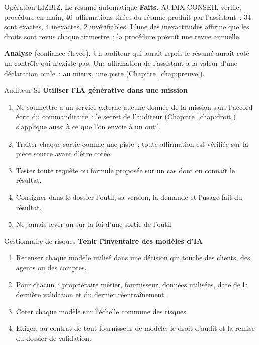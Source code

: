 \begin{boxscenario}{Opération LIZBIZ. Le résumé automatique}
\textbf{Faits.} AUDIX CONSEIL vérifie, procédure en main, 40~affirmations
tirées du résumé produit par l'assistant~: 34 sont exactes, 4 inexactes,
2 invérifiables. L'une des inexactitudes affirme que les droits sont
revus chaque trimestre~; la procédure prévoit une revue annuelle.

\medskip
\textbf{Analyse} (confiance élevée). Un auditeur qui aurait repris le
résumé aurait coté \OUI{} un contrôle qui n'existe pas. Une affirmation de
l'assistant a la valeur d'une déclaration orale~: au mieux, une piste
(Chapitre~\ref{chap:preuve}).
\end{boxscenario}

\begin{boxmetier}{Auditeur SI}
\textbf{Utiliser l'IA générative dans une mission}
\begin{enumerate}
    \item Ne soumettre à un service externe aucune donnée de la mission
          sans l'accord écrit du commanditaire~: le secret de l'auditeur
          (Chapitre~\ref{chap:droit}) s'applique aussi à ce que l'on envoie
          à un outil.
    \item Traiter chaque sortie comme une piste~: toute affirmation est
          vérifiée sur la pièce source avant d'être cotée.
    \item Tester toute requête ou formule proposée sur un cas dont on
          connaît le résultat.
    \item Consigner dans le dossier l'outil, sa version, la demande et
          l'usage fait du résultat.
    \item Ne jamais lever un \NEK{} sur la foi d'une sortie de l'outil.
\end{enumerate}
\end{boxmetier}

\begin{boxmetier}{Gestionnaire de risques}
\textbf{Tenir l'inventaire des modèles d'IA}
\begin{enumerate}
    \item Recenser chaque modèle utilisé dans une décision qui touche des
          clients, des agents ou des comptes.
    \item Pour chacun~: propriétaire métier, fournisseur, données utilisées,
          date de la dernière validation et du dernier réentraînement.
    \item Coter chaque modèle sur l'échelle commune des risques.
    \item Exiger, au contrat de tout fournisseur de modèle, le droit d'audit
          et la remise du dossier de validation.
\end{enumerate}
\end{boxmetier}

